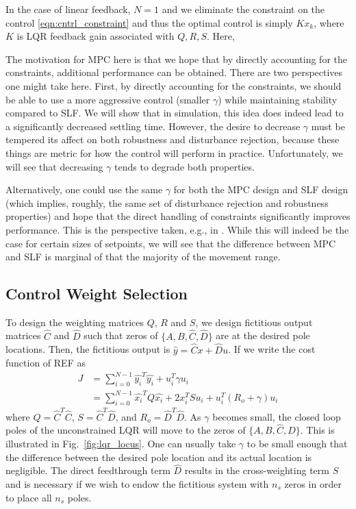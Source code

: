\documentclass[journal,twocolumn,twoside]{IEEEtran}
\begin{document}
In the case of linear feedback, $N=1$ and we eliminate the constraint on the control \eqref{eqn:cntrl_constraint} and thus the optimal control is simply $Kx_k$, where $K$ is LQR feedback gain associated with $Q, R,S$. Here, 

The motivation for MPC here is that we hope that by directly accounting for the constraints, additional performance can be obtained. There are two perspectives one might take here. First, by directly accounting for the constraints, we should be able to use a more aggressive control (smaller $\gamma$) while maintaining stability compared to SLF.
We will show that in simulation, this idea does indeed lead to a significantly decreased settling time. However, the desire to decrease $\gamma$ must be tempered its affect on both robustness and disturbance rejection, because these things are metric for how the control will perform in practice. Unfortunately, we will see that decreasing $\gamma$ tends to degrade both properties. 

Alternatively, one could use the same $\gamma$ for both the MPC design and SLF design (which implies, roughly,  the same set of disturbance rejection and robustness properties) and hope that the direct handling of constraints significantly improves performance. This is the perspective taken, e.g., in \cite{Wills_CDC_2005}. While this will indeed be the case for certain sizes of setpoints, we will see that the difference between MPC and SLF is marginal of that the majority of the movement range.

\subsection{Control Weight Selection}
To design the weighting matrices $Q$, $R$ and $S$, we design fictitious output matrices $\hat C$ and $\hat D$ such that zeros of $\{A, B, \hat C, \hat D\}$ are at the desired pole locations. Then, the fictitious output is $\hat y = \hat C x + \hat D u$. If we write the cost function of REF as
\begin{align}
  J &= \sum_{i=0}^{N-1} \hat{y_i}^T\hat{y_i} + u_i^T\gamma u_i\\
    &= \sum_{i=0}^{N-1} \hat{x_i}^TQ\hat{x_i} + 2x_i^TSu_i + u_i^T(R_o+\gamma)u_i
\end{align}
where $Q = \hat{C}^T\hat{C}$, $S =\hat{C}^T \hat{D}$, and $R_o = \hat{D}^T\hat{D}$. As $\gamma$ becomes small, the closed loop poles of the unconstrained LQR will move to the zeros of $\{A, B, \hat C, \hat D\}$. This is illustrated in Fig.~\ref{fig:lqr_locus}. One can usually take $\gamma$ to be small enough that the difference between the desired pole location and its actual location is negligible. The direct feedthrough term $\hat D$ results in the cross-weighting term $S$ and is necessary if we wish to endow the fictitious system with $n_s$ zeros in order to place all $n_s$ poles.
\end{document}
